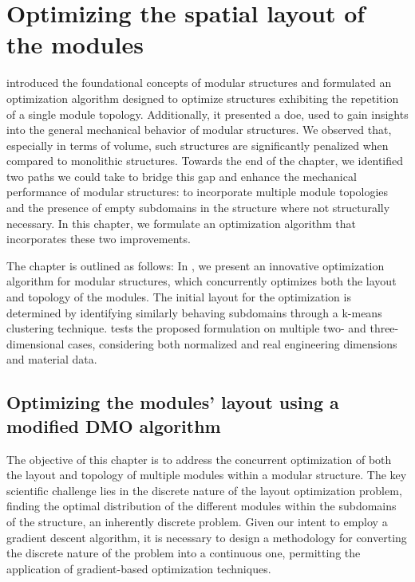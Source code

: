 \setchapterpreamble[u]{\margintoc}
\glsresetall %
\chapter{Optimizing the spatial layout of the modules} \label{chap:06}
 introduced the foundational concepts of modular structures and formulated an optimization algorithm designed to optimize structures exhibiting the repetition of a single module topology. Additionally, it presented a \gls{doe}, used to gain insights into the general mechanical behavior of modular structures. We observed that, especially in terms of volume, such structures are significantly penalized when compared to monolithic structures. Towards the end of the chapter, we identified two paths we could take to bridge this gap and enhance the mechanical performance of modular structures: to incorporate multiple module topologies and the presence of empty subdomains in the structure where not structurally necessary. In this chapter, we formulate an optimization algorithm that incorporates these two improvements.

The chapter is outlined as follows: In , we present an innovative optimization algorithm for modular structures, which concurrently optimizes both the layout and topology of the modules. The initial layout for the optimization is determined by identifying similarly behaving subdomains through a k-means clustering technique.  tests the proposed formulation on multiple two- and three-dimensional cases, considering both normalized and real engineering dimensions and material data.

\section{Optimizing the modules' layout using a modified DMO algorithm} \label{sec:06_opt}
The objective of this chapter is to address the concurrent optimization of both the layout and topology of multiple modules within a modular structure. The key scientific challenge lies in the discrete nature of the layout optimization problem, \ie finding the optimal distribution of the different modules within the subdomains of the structure, an inherently discrete problem. Given our intent to employ a gradient descent algorithm, it is necessary to design a methodology for converting the discrete nature of the problem into a continuous one, permitting the application of gradient-based optimization techniques.

